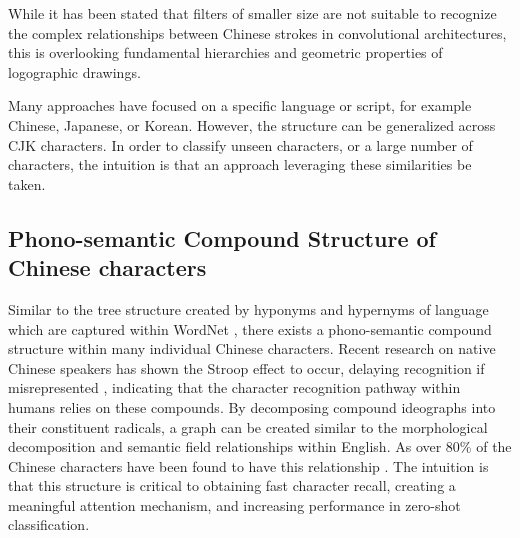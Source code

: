 While it has been stated that filters of smaller size are not suitable to recognize the complex relationships between Chinese strokes in convolutional architectures\cite{conv-chinese-character-synthesis}, this is overlooking fundamental hierarchies and geometric properties of logographic drawings.

Many approaches have focused on a specific language or script, for example Chinese\cite{online-ch}, Japanese\cite{online-ja}, or Korean\cite{offline-kr}. However, the structure can be generalized across CJK characters. In order to classify unseen characters, or a large number of characters, the intuition is that an approach leveraging these similarities be taken.

\subsection{Phono-semantic Compound Structure of Chinese characters}

Similar to the tree structure created by hyponyms and hypernyms of language which are captured within WordNet \cite{wordnet}, there exists a phono-semantic compound structure within many individual Chinese characters. Recent research on native Chinese speakers has shown the Stroop effect to occur, delaying recognition if misrepresented \cite{cjk-stroop}, indicating that the character recognition pathway within humans relies on these compounds. By decomposing compound ideographs into their constituent radicals, a graph can be created similar to the morphological decomposition and semantic field relationships within English. As over 80\% of the Chinese characters have been found to have this relationship \cite{compound-ideographs}. The intuition is that this structure is critical to obtaining fast character recall, creating a meaningful attention mechanism, and increasing performance in zero-shot classification.

